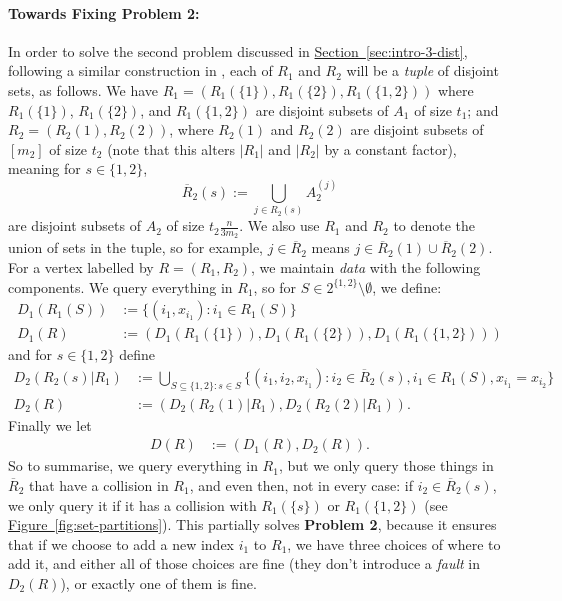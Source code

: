 \documentclass{theoretics}
\renewcommand{\sec}[1]{\hyperref[sec:#1]{Section~\ref*{sec:#1}}}
\newcommand{\fig}[1]{\hyperref[fig:#1]{Figure~\ref*{fig:#1}}}
\renewcommand{\>}{\rangle}
\newcommand{\<}{\langle}
\renewcommand{\(}{\left(}
\renewcommand{\)}{\right)}
\def\abs#1{\left| #1 \right|}
\begin{document}
\paragraph{Towards Fixing Problem 2:} In order to solve the second problem discussed in \sec{intro-3-dist}, following a similar construction in \cite{belovs2012kDist}, each of $R_1$ and $R_2$ will be a \emph{tuple} of disjoint sets, as follows. We have $R_1=(R_1(\{1\}),R_1(\{2\}),R_1(\{1,2\}))$ where $R_1(\{1\})$, $R_1(\{2\})$, and $R_1(\{1,2\})$ are disjoint subsets of $A_1$ of size $t_1$; and $R_2=(R_2(1),R_2(2))$, where $R_2(1)$ and $R_2(2)$ are disjoint subsets of $[m_2]$ of size $t_2$ (note that this alters $\abs{R_1}$ and $\abs{R_2}$ by a constant factor), meaning for $s\in\{1,2\}$, 
$$\overline{R}_2(s):=\bigcup_{j\in R_2(s)}A_2^{(j)}$$
are disjoint subsets of $A_2$ of size $t_2\frac{n}{3m_2}$. We also use $R_1$ and $R_2$ to denote the union of sets in the tuple, so for example, $j\in \overline{R}_2$ means $j\in \overline{R}_2(1)\cup\overline{R}_2(2)$. 
For a vertex labelled by $R = (R_1,R_2)$, we maintain \emph{data} with the following components. We query everything in $R_1$, so for $S\in 2^{\{1,2\}}\setminus\emptyset$, we define:
\begin{equation*}\label{eq:3-dist-D1}
\begin{split}
D_1(R_1(S)) &:= \{(i_1,x_{i_1}): i_1\in R_1(S)\}\\
D_1(R) &:= (D_1(R_1(\{1\})),D_1(R_1(\{2\})),D_1(R_1(\{1,2\})))
\end{split}
\end{equation*}
and for $s\in \{1,2\}$ define
\begin{equation}\label{eq:3-dist-D2}
\begin{split}
D_2(R_2(s)|R_1) &:= \bigcup_{S\subseteq \{1,2\}:s\in S} \{(i_1,i_2,x_{i_1}): i_2\in \overline{R}_2(s), i_1\in R_1(S),x_{i_1}=x_{i_2}\}\\
D_2(R) &:= (D_2(R_2(1)|R_1),D_2(R_2(2)|R_1)).
\end{split}
\end{equation}
Finally we let
\begin{align*}
D(R) &:= (D_1(R),D_2(R)).
\end{align*}
So to summarise, we query everything in $R_1$, but we only query those things in $\overline{R}_2$ that have a collision in $R_1$, and even then, not in every case: if $i_2\in \overline{R}_2(s)$, we only query it if it has a collision with $R_1(\{s\})$ or $R_1(\{1,2\})$ (see \fig{set-partitions}). This partially solves \textbf{Problem 2}, because it ensures that if we choose to add a new index $i_1$ to $R_1$, we have three choices of where to add it, and either all of those choices are fine (they don't introduce a \emph{fault} in $D_2(R)$), or exactly one of them is fine. 
\end{document}
